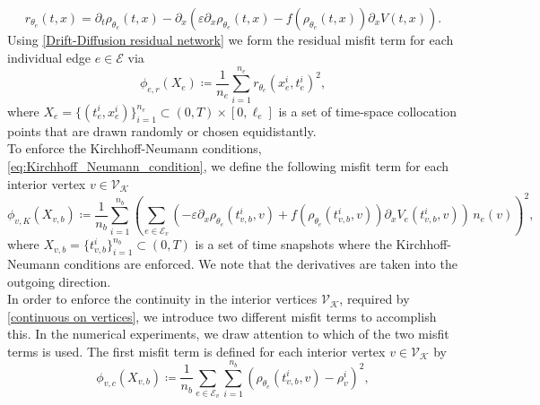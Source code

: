 \begin{equation}
    \label{Drift-Diffusion residual network}
    r_{\theta_e} \left( t,x \right)=\partial_t \rho_{\theta_e} \left( t,x \right) - \partial_x   \left(  \varepsilon \partial_x  \rho_{\theta_e} \left( t,x \right) - f \left( \rho_{\theta_e} \left( t,x \right) \right) \partial_x V \left( t,x \right) \right).
\end{equation}
Using \cref{Drift-Diffusion residual network} we form the residual misfit term for each individual edge $e \in \mathcal{E}$ via
\begin{equation} 
    \label{misfit:residual}
    \phi_{e,r}  \left( X_e \right) \coloneqq \frac{1}{n_e} \sum_{i=1}^{n_e} r_{\theta_e}  \left( x_e^i, t_e^i \right)^2,
\end{equation} 
where $X_e = \{ \left( t_e^i, x_e^i \right)\}_{i=1}^{n_e} \subset \left( 0, T \right) \times [0, \ell_e]$ is a set of time-space collocation points that are drawn randomly or chosen equidistantly. \\
To enforce the Kirchhoff-Neumann conditions, \cref{eq:Kirchhoff_Neumann_condition}, we define the following misfit term for each interior vertex $v \in \mathcal{V}_\mathcal{K}$ 
\begin{equation} 
    \label{misfit:Kirchhoff}
    \phi_{v,K}  \left( X_{v,b} \right) \coloneqq \frac{1}{n_b} \sum_{i=1}^{n_b}  \left( \sum_{e \in \mathcal{E}_v}  \left( - \varepsilon \partial_x \rho_{\theta_e}  \left( t_{v,b}^i, v \right) + f \left( \rho_{\theta_e}  \left( t_{v,b}^i, v \right) \right) \partial_x V_e \left( t_{v,b}^i, v \right) \right) \, n_e  \left( v \right) \right)^2, 
\end{equation} 
where $X_{v,b} = \{t_{v,b}^i\}_{i=1}^{n_b} \subset \left( 0,T \right)$ is a set of time snapshots where the Kirchhoff-Neumann conditions are enforced. We note that the derivatives are taken into the outgoing direction. \\
In order to enforce the continuity in the interior vertices $\mathcal{V}_\mathcal{K}$, required by \cref{continuous on vertices}, we introduce two different misfit terms to accomplish this. In the numerical experiments, we draw attention to which of the two misfit terms is used. The first misfit term is defined for each interior vertex $v \in \mathcal{V}_\mathcal{K}$ by 
\begin{equation} 
    \label{misfit:continuity}
    \phi_{v,c}  \left( X_{v,b} \right) \coloneqq \frac{1}{n_b} \sum_{e \in \mathcal{E}_v} \sum_{i=1}^{n_b} \left(  \rho_{\theta_e}  \left( t_{v,b}^i, v \right) - \rho_{v}^i \right)^2,
\end{equation} 
